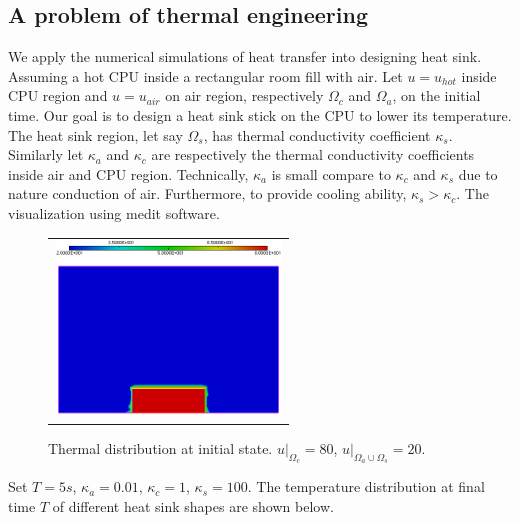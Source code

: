 \subsection{A problem of thermal engineering}
We apply the numerical simulations of heat transfer into designing heat sink. Assuming a hot CPU inside a rectangular room fill with air. Let $u=u_{hot}$ inside CPU region and $u=u_{air}$ on air region, respectively $\Omega_{c}$ and $\Omega_{a}$, on the initial time. Our goal is to design a heat sink stick on the CPU to lower its temperature. \\
The heat sink region, let say $\Omega_{s}$, has thermal conductivity coefficient $\kappa_s$. Similarly let $\kappa_a$ and $\kappa_c$ are respectively the thermal conductivity coefficients inside air and CPU region. Technically, $\kappa_a$ is small compare to $\kappa_c$ and $\kappa_s$ due to nature conduction of air. Furthermore, to provide cooling ability, $\kappa_s>\kappa_c$. The visualization using medit software.\\
\begin{figure}[http]
	\centering
	\begin{tabular}{c}
		\includegraphics[width=6cm]{figures/begin}
	\end{tabular}
	\caption{Thermal distribution at initial state. $u|_{\Omega_{c}} = 80$, $u|_{\Omega_{a}\cup\Omega_{s}}=20$.}
\end{figure}
Set $T=5s$, $\kappa_a=0.01$, $\kappa_c=1$, $\kappa_s=100$. The temperature distribution at final time $T$ of different heat sink shapes are shown below.\\
